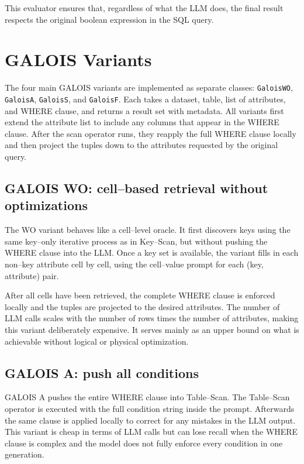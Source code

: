 \documentclass[11pt]{article}
\begin{document}
This evaluator ensures that, regardless of what the LLM does, the final result respects the original boolean expression in the SQL query.

\clearpage
\section{GALOIS Variants}

The four main GALOIS variants are implemented as separate classes: \texttt{GaloisWO}, \texttt{GaloisA}, \texttt{GaloisS}, and \texttt{GaloisF}. Each takes a dataset, table, list of attributes, and WHERE clause, and returns a result set with metadata. All variants first extend the attribute list to include any columns that appear in the WHERE clause. After the scan operator runs, they reapply the full WHERE clause locally and then project the tuples down to the attributes requested by the original query.

\subsection{GALOIS WO: cell–based retrieval without optimizations}

The WO variant behaves like a cell–level oracle. It first discovers keys using the same key–only iterative process as in Key–Scan, but without pushing the WHERE clause into the LLM. Once a key set is available, the variant fills in each non–key attribute cell by cell, using the cell–value prompt for each (key, attribute) pair.

After all cells have been retrieved, the complete WHERE clause is enforced locally and the tuples are projected to the desired attributes. The number of LLM calls scales with the number of rows times the number of attributes, making this variant deliberately expensive. It serves mainly as an upper bound on what is achievable without logical or physical optimization.

\subsection{GALOIS A: push all conditions}

GALOIS A pushes the entire WHERE clause into Table–Scan. The Table–Scan operator is executed with the full condition string inside the prompt. Afterwards the same clause is applied locally to correct for any mistakes in the LLM output. This variant is cheap in terms of LLM calls but can lose recall when the WHERE clause is complex and the model does not fully enforce every condition in one generation.
\end{document}
